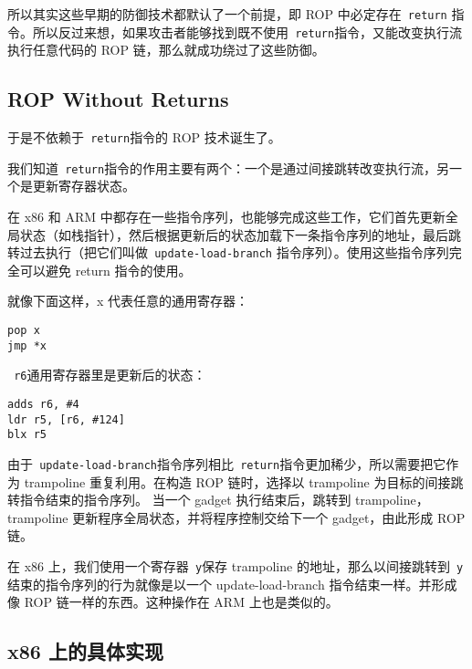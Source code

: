\documentclass{article}
\begin{document}
所以其实这些早期的防御技术都默认了一个前提，即 ROP 中必定存在\verb+ return+ 指令。所以反过来想，如果攻击者能够找到既不使用\verb+ return+指令，又能改变执行流执行任意代码的 ROP 链，那么就成功绕过了这些防御。

\newpage
\begin{center}
    \section{ROP Without Returns}    
\end{center}

于是不依赖于\verb+ return+指令的 ROP 技术诞生了。

我们知道\verb+ return+指令的作用主要有两个：一个是通过间接跳转改变执行流，另一个是更新寄存器状态。

在 x86 和 ARM 中都存在一些指令序列，也能够完成这些工作，它们首先更新全局状态（如栈指针），然后根据更新后的状态加载下一条指令序列的地址，最后跳转过去执行（把它们叫做\verb+ update-load-branch+ 指令序列）。使用这些指令序列完全可以避免 return 指令的使用。

就像下面这样，x 代表任意的通用寄存器：
\begin{verbatim}
pop x
jmp *x
\end{verbatim}

\verb+ r6+通用寄存器里是更新后的状态：
\begin{verbatim}
adds r6, #4
ldr r5, [r6, #124]
blx r5
\end{verbatim}

由于\verb+ update-load-branch+指令序列相比\verb+ return+指令更加稀少，所以需要把它作为 trampoline 重复利用。在构造 ROP 链时，选择以 trampoline 为目标的间接跳转指令结束的指令序列。
当一个 gadget 执行结束后，跳转到 trampoline，trampoline 更新程序全局状态，并将程序控制交给下一个 gadget，由此形成 ROP 链。



在 x86 上，我们使用一个寄存器\verb+ y+保存 trampoline 的地址，那么以间接跳转到\verb+ y+ 结束的指令序列的行为就像是以一个 update-load-branch 指令结束一样。并形成像 ROP 链一样的东西。这种操作在 ARM 上也是类似的。
\newpage

\begin{center}
    \section{x86 上的具体实现}
\end{center}
\end{document}
